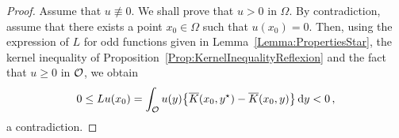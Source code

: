 \begin{proof}
	Assume that $u \not \equiv 0$. We shall prove that $u > 0$ in $\Omega$. By contradiction, assume that there exists a point $x_0\in \Omega$ such that $u(x_0)= 0$. Then, using the expression of $L$ for odd functions given in Lemma~\ref{Lemma:PropertiesStar}, the kernel inequality of	 Proposition~\ref{Prop:KernelInequalityReflexion} and the fact that $u\geq 0$ in $\mathcal{O}$, we obtain
	$$
	0 \leq Lu(x_0) = \int_{\mathcal{O}} u(y)\big \{\overline{K}(x_0, y^\star) - \overline{K}(x_0, y) \big \}\,\mathrm{d} y < 0\,,
	$$
	a contradiction.
\end{proof}


